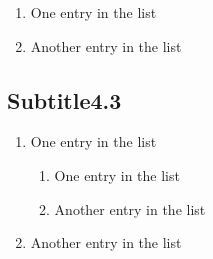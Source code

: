 \documentclass{uimppracticas}
\begin{document}
  \begin{enumerate}
    \item One entry in the list
    \item Another entry in the list
  \end{enumerate}

\subsection{Subtitle4.3}

  \begin{enumerate}
    \item One entry in the list
    \begin{enumerate}
      \item One entry in the list
      \item Another entry in the list
    \end{enumerate}
    \item Another entry in the list
  \end{enumerate}

\newpage



\end{document}
